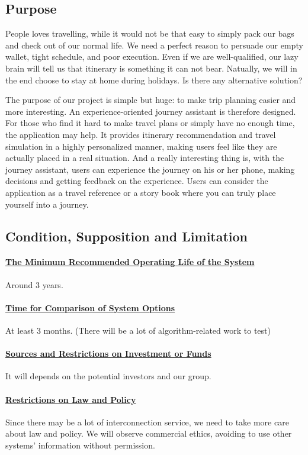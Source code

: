 \documentclass[10pt]{article}
\begin{document}
\subsection{Purpose}
People loves travelling, while it would not be that easy to simply pack our bags and check out of our normal life. We need a perfect reason to persuade our empty wallet, tight schedule, and poor execution. Even if we are well-qualified, our lazy brain will tell us that itinerary is something it can not bear. Natually, we will in the end choose to stay at home during holidays. Is there any alternative solution?

The purpose of our project is simple but huge: to make trip planning easier and more interesting. An experience-oriented journey assistant is therefore designed. For those who find it hard to make travel plans or simply have no enough time, the application may help. It provides itinerary recommendation and travel simulation in a highly personalized manner, making users feel like they are actually placed in a real situation. And a really interesting thing is, with the journey assistant, users can experience the journey on his or her phone, making decisions and getting feedback on the experience. Users can consider the application as a travel reference or a story book where you can truly place yourself into a journey.

\subsection{Condition, Supposition and Limitation}
\paragraph{\underline{The Minimum Recommended Operating Life of the System}} 
Around 3 years.

\paragraph{\underline{Time for Comparison of System Options}}
At least 3 months. (There will be a lot of algorithm-related work to test)

\paragraph{\underline{Sources and Restrictions on Investment or Funds}}
It will depends on the potential investors and our group.

\paragraph{\underline{Restrictions on Law and Policy}}
Since there may be a lot of interconnection service, we need to take more care about law and policy. We will observe commercial ethics, avoiding to use other systems' information without permission.
\end{document}
